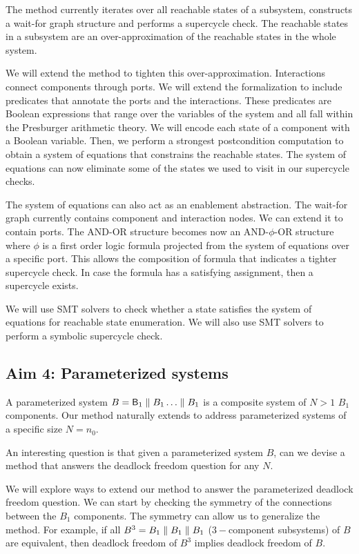 The method currently iterates over all reachable states of
a subsystem, constructs a wait-for graph structure and 
performs a supercycle check. 
The reachable states in a subsystem are an over-approximation
of the reachable states in the whole system. 

We will extend the method to tighten this over-approximation. 
Interactions connect components through ports. 
%
We will extend the formalization to include predicates 
that annotate the ports and the interactions. 
These predicates are Boolean expressions that range over the
variables of the system and all fall within 
the Presburger arithmetic theory. 
%
We will encode each state of a component with a Boolean 
variable.
Then, we perform a strongest postcondition computation to 
obtain a system of equations that constrains the reachable 
states.
%
The system of equations can now eliminate some of the states
we used to visit in our supercycle checks. 

The system of equations can also act as an enablement abstraction.
The wait-for graph currently contains component and interaction nodes. 
We can extend it to contain ports. 
The AND-OR structure becomes now an AND-$\phi$-OR structure
where $\phi$ is a first order logic formula projected from
the system of equations over a specific port. 
This allows the composition of formula that indicates
a tighter supercycle check. 
In case the formula has a satisfying assignment, then
a supercycle exists. 

We will use SMT solvers to check whether a state 
satisfies the system of equations for reachable state 
enumeration. 
We will also use SMT solvers to perform a symbolic
supercycle check.

\subsection{Aim 4: Parameterized systems} 

A parameterized system $B=\mathsf{B}_1 \parallel B_1 \ldots \parallel B_1$ is a 
composite system of $N>1$ $B_1$ components. 
Our method naturally extends to address parameterized systems 
of a specific size $N=n_0$. 

An interesting question is that given a parameterized system $B$, 
can we devise a method that answers the deadlock freedom
question for any $N$. 

We will explore ways to extend our method to answer the 
parameterized deadlock freedom question. 
We can start by checking the symmetry of the connections between
the $B_1$ components.
The symmetry can allow us to generalize the method. 
For example, if all $B^3=B_1\parallel B_1 \parallel B_1$ 
($3-$component subsystems) of $B$ are equivalent,
then deadlock freedom of $B^3$ implies deadlock freedom 
of $B$. 


